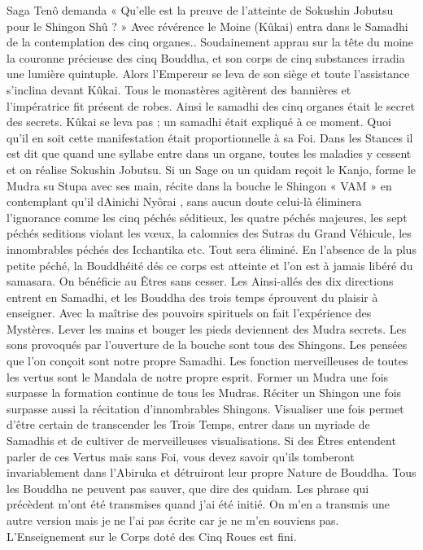 Saga Tenô demanda « Qu’elle est la preuve de l’atteinte de Sokushin Jobutsu pour le Shingon Shû ? » Avec révérence le Moine (Kûkai) entra dans le Samadhi de la contemplation des cinq organes.. Soudainement apprau sur la tête du moine la couronne précieuse des cinq Bouddha, et son corps de cinq substances irradia une lumière quintuple. Alors l’Empereur se leva de son siège et toute l’assistance s’inclina devant Kûkai. Tous le monastères agitèrent des bannières et l’impératrice fit présent de robes. Ainsi le samadhi des cinq organes était le secret des secrets. Kûkai se leva pas ; un samadhi était expliqué à ce moment. Quoi qu’il en soit cette manifestation était proportionnelle à sa Foi.
Dans les Stances il est dit que quand une syllabe entre dans un organe, toutes les maladies y cessent et on réalise Sokushin Jobutsu. Si un Sage ou un quidam reçoit le Kanjo, forme le Mudra su Stupa avec ses main, récite dans la bouche le Shingon « VAM » en contemplant qu’il dAinichi Nyôrai , sans aucun doute celui-là éliminera l’ignorance comme les cinq péchés séditieux, les quatre péchés majeures, les sept péchés seditions violant les vœux, la calomnies des Sutras du Grand Véhicule, les innombrables péchés des Icchantika etc. Tout sera éliminé.
En l’absence de la plus petite péché, la Bouddhéité dés ce corps est atteinte et l’on est à jamais libéré du samasara. On bénéficie au Êtres sans cesser. Les Ainsi-allés des dix directions entrent en Samadhi, et les Bouddha des trois temps éprouvent du plaisir à enseigner. Avec la maîtrise des pouvoirs spirituels on fait l’expérience des Mystères. Lever les mains et bouger les pieds deviennent des Mudra secrets. Les sons provoqués par l’ouverture de la bouche sont tous des Shingons. Les pensées que l’on conçoit sont notre propre Samadhi. Les fonction merveilleuses de toutes les vertus sont le Mandala de notre propre esprit. Former un Mudra une fois surpasse la formation continue de tous les Mudras. Réciter un Shingon une fois surpasse aussi la récitation d’innombrables Shingons. Visualiser une fois permet d’être certain de transcender les Trois Temps, entrer dans un myriade de Samadhis et de cultiver de merveilleuses visualisations.
Si des Êtres entendent parler de ces Vertus mais sans Foi, vous devez savoir qu’ils tomberont invariablement dans l’Abiruka et détruiront leur propre Nature de Bouddha. Tous les Bouddha ne peuvent pas sauver, que dire des quidam.
Les phrase qui précèdent m'ont été transmises quand j'ai été initié. On m’en a transmis une autre version mais je ne l’ai pas écrite car je ne m’en souviens pas. L’Enseignement sur le Corps doté des Cinq Roues est fini.
